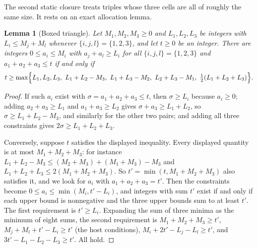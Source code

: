 \documentclass[11pt]{article}
\numberwithin{equation}{section}
\newtheorem{lemma}[theorem]{Lemma}
\theoremstyle{definition}
\theoremstyle{remark}
\begin{document}
The second static closure treats triples whose three cells are all of
roughly the same size. It rests on an exact allocation lemma.

\begin{lemma}[Boxed triangle]\label{lem:triangle}
Let $M_1,M_2,M_3\ge0$ and $L_1,L_2,L_3$ be integers with
$L_i\le M_j+M_l$ whenever $\{i,j,l\}=\{1,2,3\}$, and let $t\ge0$ be an
integer. There are integers $0\le a_i\le M_i$ with $a_j+a_l\ge L_i$ for
all $\{i,j,l\}=\{1,2,3\}$ and $a_1+a_2+a_3\le t$ if and only if
\[
 t\ge\max\Bigl\{L_1,L_2,L_3,\ L_1+L_2-M_3,\ L_1+L_3-M_2,\ L_2+L_3-M_1,\
 \tfrac12(L_1+L_2+L_3)\Bigr\}.
\]
\end{lemma}
\begin{proof}
If such $a_i$ exist with $\sigma=a_1+a_2+a_3\le t$, then $\sigma\ge L_i$
because $a_i\ge0$; adding $a_2+a_3\ge L_1$ and $a_1+a_3\ge L_2$ gives
$\sigma+a_3\ge L_1+L_2$, so $\sigma\ge L_1+L_2-M_3$, and similarly for the
other two pairs; and adding all three constraints gives
$2\sigma\ge L_1+L_2+L_3$.

Conversely, suppose $t$ satisfies the displayed inequality. Every
displayed quantity is at most $M_1+M_2+M_3$: for instance
$L_1+L_2-M_3\le(M_2+M_3)+(M_1+M_3)-M_3$ and
$L_1+L_2+L_3\le2(M_1+M_2+M_3)$. So $t'=\min(t,M_1+M_2+M_3)$ also
satisfies it, and we look for $a_i$ with $a_1+a_2+a_3=t'$. Then the
constraints become $0\le a_i\le\min(M_i,t'-L_i)$, and integers with sum
$t'$ exist if and only if each upper bound is nonnegative and the three
upper bounds sum to at least $t'$. The first requirement is $t'\ge L_i$.
Expanding the sum of three minima as the minimum of eight sums, the
second requirement is $M_1+M_2+M_3\ge t'$, $M_j+M_l+t'-L_i\ge t'$ (the
host conditions), $M_i+2t'-L_j-L_l\ge t'$, and $3t'-L_1-L_2-L_3\ge t'$.
All hold.
\end{proof}
\end{document}
